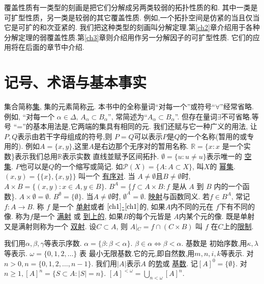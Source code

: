 \documentclass[main.tex]{subfiles}
\begin{document}
	
覆盖性质有一类型的刻画是把它们分解成另两类较弱的拓扑性质的和.
其中一类是可扩型性质，另一类是较弱的其它覆盖性质.
例如,一个拓扑空间是仿紧的当且仅当它是可扩的和次亚紧的.
我们把这种类型的刻画叫分解定理.第\ref{ch2}章介绍用于各种
分解定理的弱覆盖性质.第\ref{ch3}章则介绍用作另一分解因子的可扩型性质.
它们的应用将在后面的章节中介绍.
	
\chapter{记号、术语与基本事实}\label{ch1}

集合简称\underline{集},
集的元素简称\underline{元}.
本书中的全称量词``对每一个''或符号``$\forall$”经常省略.例如, “对每一个
$\alpha\in\Delta$, $A_\alpha \subset B_\alpha$”,
常简述为“$A_\alpha \subset B_\alpha$”.
但存在量词$\exists$不可省略.等号
“=”的基本用法是,它两端的集具有相同的元.
我们还赋与它一种广义的用法, 让$P, Q$表示由若干字母组成的符号,则
$P=Q$可以表示$P$是$Q$的一个名称(暂用的或专用的).
例如$A=\{x,y\}$,这里$A$是右边那个无序对的暂用名称.
$\mathbb{R} = \{x: x$ 是一个实数\}表示我们总用$\mathbb{R}$表示实数
直线並赋予区间拓扑.
$\emptyset=\{u: u\ne u\}$表示唯一的
\underline{空集}.
$P$也可以是$Q$的一个缩写或简记. 如$\mathscr{P}(X)=\{A:A\subset X\}$, 叫$X$的
\underline{幂集}.
$(x, y) = \{ \{x\}, \{x, y\}\}$ 叫一个
\underline{有序对}. 
当 $A\ne \emptyset$且$B\ne \emptyset$时, $A\times B = \{(x, y): x\in A, y\in B\}$.
$B^A = \{f\subset A\times B: f$ 是从 $A$ 到 $B$ 内的一个函数\}.
$A\times \emptyset = \emptyset$. $B^\emptyset = \{\emptyset\}$.
当$A\ne\emptyset$时, $\emptyset^A=\emptyset$.
\underline{映射}与函数同义.  
若$f\in B^A$, 常记 $f: A\to B$. 称 $f$ 是一个
\underline{单射}或者
\underline{$\ref{ch1}$-$\ref{ch1}$}\index{$\ref{ch1}$-$\ref{ch1}$| \S\ref{ch1}\hfill}的,
如果$A$内不同的元在  $f$下有不同的像.
称为$f$是一个
\underline{满射}
或
\underline{到上的},
如果$B$的每个元皆是
$A$内某个元的像. 既是单射又是满射则称为一个
\underline{双射}.
设$C\subset A$, 则 $A\vert{}_C = f\cap (C\times B)$ 叫 $f$
在$C$上的\underline{限制}.

我们用$\alpha, \beta, \gamma$等表示序数. $\alpha = \{\beta: \beta < \alpha\}$. $\beta \in \alpha \Leftrightarrow\beta<\alpha$. 基数是
初始序数,用$\kappa,\lambda$ 等表示. $\omega = \{0, 1, 2, \dots\}$ 表
最小无限基数.它的元,即自然数,用$m, n, i , k$等表示.
对$n>0, n = \{0,1,2, \dots, n-1\}$. 我们用$|A|$表示$A$ 
的\underline{势}或
\underline{基数}.
记$[A]^0=\{\emptyset\}$. 对$n\ge1, [A]^n = \{S\subset A: |S| = n\}$.
$[A]^{<\omega} = \bigcup_{n<\omega}[A]^n$.
\end{document}
